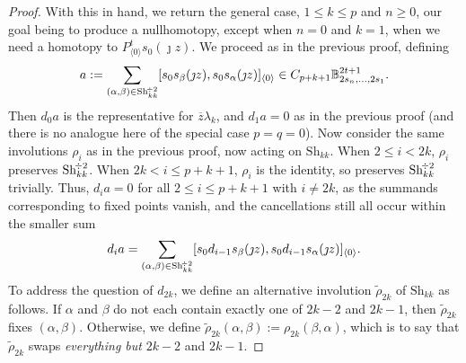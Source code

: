 \documentclass[11pt]{amsart} \renewcommand{\baselinestretch}{1.4}
\theoremstyle{plain}
\theoremstyle{definition}
\newcommand{\Shuffles}[2]{\mathrm{Sh}_{#1#2}}
\newcommand{\HalfShuffles}[2]{\mathrm{Sh}_{#1#2}^{\smash{\!\div2}}}
\begin{document}
\begin{Koszul complexes}
\begin{proof}
With this in hand, we return the general case, $1\leq k\leq p$ and $n\geq0$, our goal being to produce a nullhomotopy, except when $n=0$ and $k=1$, when we need a homotopy to $P^t_{\langle 0\rangle}s_0(\jmath z)$. We proceed as in the previous proof, defining
\[a:=\sum_{(\alpha,\beta)\in\HalfShuffles{k}{k}}[s_{0}s_\beta(\jmath z), s_{0}s_\alpha(\jmath z)]_{\langle 0\rangle}\in C_{p+k+1}\mathbb{B}_{2s_n,\ldots,2s_1}^{2t+1}.\]
Then $d_0a$ is the representative for $\overline{z}\lambda_k$, and $d_1a=0$ as in the previous proof (and there is no analogue here of the special case $p=q=0$). Now consider the same involutions $\rho_i$ as in the previous proof, now acting on $\Shuffles{k}{k}$. When $2\leq i< 2k$, $\rho_i$ preserves $\HalfShuffles{k}{k}$. When $2k<i\leq p+k+1$, $\rho_i$ is the identity, so preserves $\HalfShuffles{k}{k}$ trivially. Thus, $d_ia=0$ for all $2\leq i\leq p+k+1$ with $i\neq2k$, as the summands corresponding to fixed points vanish, and the cancellations still all occur within the smaller sum
\[d_{i}a=\sum_{(\alpha,\beta)\in\HalfShuffles{k}{k}} [s_{0}d_{i-1}s_\beta(\jmath z), s_{0}d_{i-1}s_\alpha(\jmath z)]_{\langle 0\rangle}.\]
To address the question of $d_{2k}$, we define an alternative involution $\widetilde{\rho}_{2k}$ of $\Shuffles{k}{k}$ as follows.  If $\alpha$ and $\beta$ do not each contain exactly one of $2k-2$ and $2k-1$, then $\widetilde{\rho}_{2k}$ fixes $(\alpha,\beta)$. Otherwise, we define $\widetilde{\rho}_{2k}(\alpha,\beta):=\rho_{2k}(\beta,\alpha)$, which is to say that $\widetilde{\rho}_{2k}$ swaps \emph{everything but} $2k-2$ and $2k-1$.


\end{proof}
\end{Koszul complexes}
\end{document}
